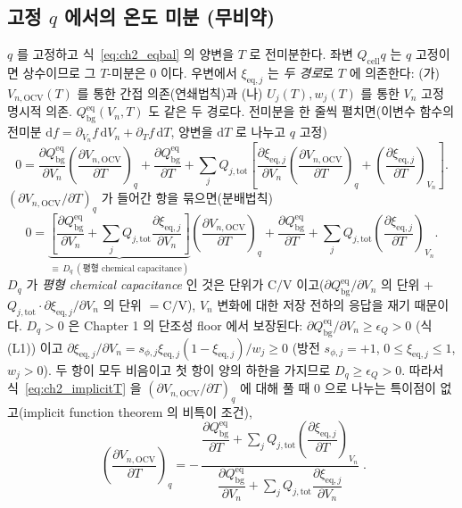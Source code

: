 \documentclass[11pt,a4paper]{article}
\newcommand{\dd}{\mathrm{d}}
\newcommand{\eq}{\mathrm{eq}}
\newcommand{\bg}{\mathrm{bg}}
\newcommand{\cell}{\mathrm{cell}}
\newcommand{\OCV}{\mathrm{OCV}}
\newcommand{\tot}{\mathrm{tot}}
\begin{document}
\subsection{고정 $q$ 에서의 온도 미분 (무비약)}\label{sec:ch2_ocvT_fix}
$q$ 를 고정하고 식~\eqref{eq:ch2_eqbal} 의 양변을 $T$ 로 전미분한다. 좌변 $Q_\cell q$ 는 $q$ 고정이면 상수이므로
그 $T$-미분은 $0$ 이다. 우변에서 $\xi_{\eq,j}$ 는 \emph{두 경로}로 $T$ 에 의존한다: (가) $V_{n,\OCV}(T)$ 를 통한
간접 의존(연쇄법칙)과 (나) $U_j(T),w_j(T)$ 를 통한 $V_n$ 고정 명시적 의존. $Q_\bg^{\eq}(V_n,T)$ 도 같은 두 경로다.
전미분을 한 줄씩 펼치면(이변수 함수의 전미분 $\dd f=\partial_{V_n}f\,\dd V_n+\partial_T f\,\dd T$, 양변을 $\dd T$
로 나누고 $q$ 고정)
\begin{equation}
0=\frac{\partial Q_\bg^{\eq}}{\partial V_n}\left(\frac{\partial V_{n,\OCV}}{\partial T}\right)_q+\frac{\partial Q_\bg^{\eq}}{\partial T}
+\sum_{j}Q_{j,\tot}\!\left[\frac{\partial\xi_{\eq,j}}{\partial V_n}\left(\frac{\partial V_{n,\OCV}}{\partial T}\right)_q
+\left(\frac{\partial\xi_{\eq,j}}{\partial T}\right)_{V_n}\right].
\label{eq:ch2_implicitT_raw}
\end{equation}
$(\partial V_{n,\OCV}/\partial T)_q$ 가 들어간 항을 묶으면(분배법칙)
\begin{equation}
0=\underbrace{\left[\frac{\partial Q_\bg^{\eq}}{\partial V_n}+\sum_{j}Q_{j,\tot}\frac{\partial\xi_{\eq,j}}{\partial V_n}\right]}_{\equiv\,D_q\ (\text{평형 chemical capacitance})}
\left(\frac{\partial V_{n,\OCV}}{\partial T}\right)_q
+\frac{\partial Q_\bg^{\eq}}{\partial T}+\sum_{j}Q_{j,\tot}\left(\frac{\partial\xi_{\eq,j}}{\partial T}\right)_{V_n}.
\label{eq:ch2_implicitT}
\end{equation}
$D_q$ 가 \emph{평형 chemical capacitance} 인 것은 단위가 $\mathrm{C/V}$ 이고($\partial Q_\bg^{\eq}/\partial V_n$ 의
단위 + $Q_{j,\tot}\cdot\partial\xi_{\eq,j}/\partial V_n$ 의 단위 $=\mathrm C/\mathrm V$), $V_n$ 변화에 대한
저장 전하의 응답을 재기 때문이다. $D_q>0$ 은 Chapter 1 의 단조성 floor 에서 보장된다: $\partial Q_\bg^{\eq}/\partial V_n\ge\epsilon_Q>0$
(식 (L1)) 이고 $\partial\xi_{\eq,j}/\partial V_n=s_{\phi,j}\xi_{\eq,j}(1-\xi_{\eq,j})/w_j\ge0$ (방전
$s_{\phi,j}=+1$, $0\le\xi_{\eq,j}\le1$, $w_j>0$). 두 항이 모두 비음이고 첫 항이 양의 하한을 가지므로 $D_q\ge\epsilon_Q>0$.
따라서 식~\eqref{eq:ch2_implicitT} 을 $(\partial V_{n,\OCV}/\partial T)_q$ 에 대해 풀 때 $0$ 으로 나누는 특이점이
없고(implicit function theorem 의 비특이 조건),
\begin{equation}
\boxed{\;\left(\frac{\partial V_{n,\OCV}}{\partial T}\right)_q
=-\,\frac{\dfrac{\partial Q_\bg^{\eq}}{\partial T}+\displaystyle\sum_{j}Q_{j,\tot}\left(\dfrac{\partial\xi_{\eq,j}}{\partial T}\right)_{V_n}}
{\dfrac{\partial Q_\bg^{\eq}}{\partial V_n}+\displaystyle\sum_{j}Q_{j,\tot}\dfrac{\partial\xi_{\eq,j}}{\partial V_n}}\;.}
\label{eq:ch2_dVocvdT}
\end{equation}
\end{document}

